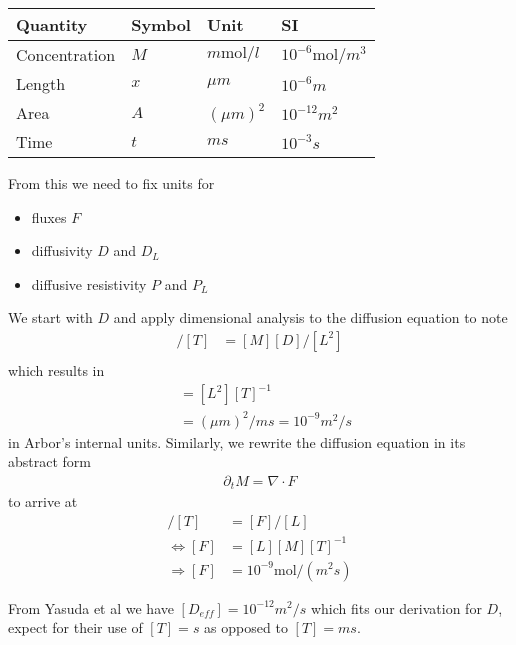 \documentclass[a4paper]{article}
\begin{document}
\begin{center}
\begin{tabular}{llll}
\hline
Quantity & Symbol & Unit & SI\\
\hline
Concentration & \(M\) & \(m\mathrm{mol}/l\) & \(10^{-6} \mathrm{mol}/m^{3}\)\\
Length & \(x\) & \(\mu m\) & \(10^{-6} m\)\\
Area & \(A\) & \((\mu m)^{2}\) & \(10^{-12} m^{2}\)\\
Time & \(t\) & \(ms\) & \(10^{-3} s\)\\
\hline
\end{tabular}
\end{center}

From this we need to fix units for
\begin{itemize}
\item fluxes \(F\)
\item diffusivity \(D\) and \(D_{L}\)
\item diffusive resistivity \(P\) and \(P_{L}\)
\end{itemize}

We start with \(D\) and apply dimensional analysis to the diffusion equation to note
\begin{align*}
[M]/[T] &= [M][D]/[L^{2}]\\
\end{align*}
which results in
\begin{align*}
[D] &= [L^{2}][T]^{-1}\\
&= (\mu m)^{2}/ms = 10^{-9} m^{2}/ s
\end{align*}
in Arbor's internal units.
Similarly, we rewrite the diffusion equation in its abstract form
\begin{align*}
\partial_{t} M = \nabla \cdot F
\end{align*}
to arrive at
\begin{align*}
[M]/[T] &= [F]/[L]\\
\Leftrightarrow [F] &= [L][M][T]^{-1}\\
\Rightarrow [F] &= 10^{-9} \mathrm{mol}/(m^{2} s)
\end{align*}

From Yasuda et al we have \([D_{eff}] = 10^{-12}m^{2}/s\) which fits our derivation
for \(D\), expect for their use of \([T] = s\) as opposed to \([T]=ms\).
\end{document}
